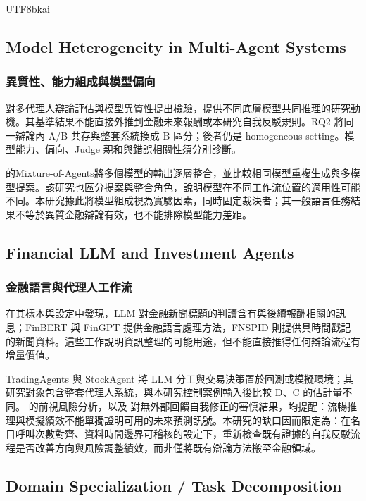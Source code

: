 \documentclass[12pt,a4paper]{article}
\newcommand{\grp}[1]{\textsf{#1}}
\begin{document}
\begin{CJK}{UTF8}{bkai}
\subsection{Model Heterogeneity in Multi-Agent Systems}

\subsubsection{異質性、能力組成與模型偏向}

\citet{zhang2025stop} 對多代理人辯論評估與模型異質性提出檢驗，提供不同底層模型共同推理的研究動機。其基準結果不能直接外推到金融未來報酬或本研究自我反駁規則。RQ2 將同一辯論內 A/B 共存與整套系統換成 B 區分；後者仍是 homogeneous setting。模型能力、偏向、Judge 親和與錯誤相關性須分別診斷。

\citet{wang2024moa} 的Mixture-of-Agents將多個模型的輸出逐層整合，並比較相同模型重複生成與多模型提案。該研究也區分提案與整合角色，說明模型在不同工作流位置的適用性可能不同。本研究據此將模型組成視為實驗因素，同時固定裁決者；其一般語言任務結果不等於異質金融辯論有效，也不能排除模型能力差距。

\subsection{Financial LLM and Investment Agents}

\subsubsection{金融語言與代理人工作流}
\citet{lopezlira2023chatgpt} 在其樣本與設定中發現，LLM 對金融新聞標題的判讀含有與後續報酬相關的訊息；FinBERT \citep{araci2019finbert} 與 FinGPT \citep{liu2023fingpt} 提供金融語言處理方法，FNSPID \citep{dong2024fnspid} 則提供具時間戳記的新聞資料。這些工作說明資訊整理的可能用途，但不能直接推得任何辯論流程有增量價值。

TradingAgents \citep{xiao2024tradingagents} 與 StockAgent \citep{zhang2024stockagent} 將 LLM 分工與交易決策置於回測或模擬環境；其研究對象包含整套代理人系統，與本研究控制案例輸入後比較 \grp{D}、\grp{C} 的估計量不同。\citet{glasserman2023lookahead} 的前視風險分析，以及 \citet{huang2024selfcorrect} 對無外部回饋自我修正的審慎結果，均提醒：流暢推理與模擬績效不能單獨證明可用的未來預測訊號。本研究的缺口因而限定為：在名目呼叫次數對齊、資料時間邊界可稽核的設定下，重新檢查既有證據的自我反駁流程是否改善方向與風險調整績效，而非僅將既有辯論方法搬至金融領域。
\subsection{Domain Specialization / Task Decomposition}


\end{CJK}
\end{document}
